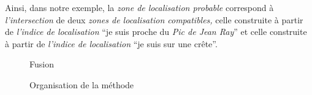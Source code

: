 Ainsi, dans notre exemple, la \emph{zone de localisation probable}
correspond à \emph{l'intersection} de deux \emph{zones de localisation
  compatibles,} celle construite à partir de \emph{l'indice de
  localisation} \enquote{je suis proche du \emph{Pic de Jean Ray}} et
celle construite à partir de \emph{l'indice de localisation}
\enquote{je suis sur une crête}.

\begin{figure}
  \centering
  
  \caption{Fusion}
  \label{fig:ex_fus_inf}
\end{figure}

\begin{landscape}
  \begin{figure}[H]
    \centering
    
    \caption{Organisation de la méthode}
    \label{fig:methodo_1}
  \end{figure}
\end{landscape}


